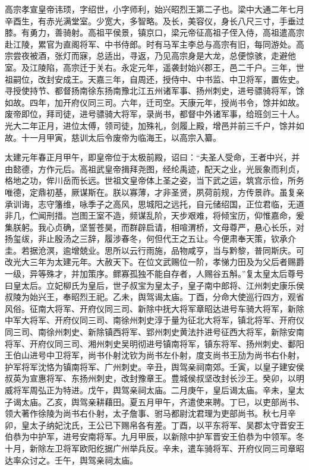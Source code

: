 \documentclass[]{article}
\begin{document}
高宗孝宣皇帝讳顼，字绍世，小字师利，始兴昭烈王第二子也。梁中大通二年七月辛酉生，有赤光满堂室。少宽大，多智略。及长，美容仪，身长八尺三寸，手垂过膝。有勇力，善骑射。高祖平侯景，镇京口，梁元帝征高祖子侄入侍，高祖遣高宗赴江陵，累官为直阁将军、中书侍郎。时有马军主李总与高宗有旧，每同游处。高宗尝夜被酒，张灯而寐，总适出，寻返，乃见高宗身是大龙，总便惊骇，走避他室。及江陵陷，高宗迁于关右。永定元年，遥袭封始兴郡王，邑二千户。三年，世祖嗣位，改封安成王。天嘉三年，自周还，授侍中、中书监、中卫将军，置佐史。寻授使持节、都督扬南徐东扬南豫北江五州诸军事、扬州刺史，进号骠骑将军，馀如故。四年，加开府仪同三司。六年，迁司空。天康元年，授尚书令，馀并如故。废帝即位，拜司徒，进号骠骑大将军，录尚书，都督中外诸军事，给班剑三十人。光大二年正月，进位太傅，领司徒，加殊礼，剑履上殿，增邑并前三千户，馀并如故。十一月甲寅，慈训太后令废帝为临海王，以高宗入纂。

太建元年春正月甲午，即皇帝位于太极前殿，诏曰：``夫圣人受命，王者中兴，并由懿德，方作元后。高祖武皇帝揖拜尧图，经纶禹迹，配天之业，光辰象而利贞，格地之功，侔川岳而长远。世祖文皇帝体上圣之姿，当下武之运，筑宫示俭，所务唯德，定鼎初基，厥谋斯在。朕以寡薄，才非圣贤，夙荷前规，方传景祚。虽复亲承训诲，志守籓维，咏季子之高风，思城阳之远托，自元储绍国，正位君临，无道非几，伫闻刑措。岂图王室不造，频谋乱阶，天步艰难，将倾宝历，仰惟嘉命，爰集朕躬。我心贞确，坚誓苍昊，而群辟启请，相喧渭桥，文母尊严，悬心长乐，对扬玺绂，非止殷汤之三辞，履涉春冬，何但代王之五让。今便肃奉天策，钦承介圭。若据沧溟，逾增兢业。思所以云行雨施，品物咸亨，当与黔黎，普同斯庆。可改光大三年为太建元年。大赦天下。在位文武赐位一阶，孝悌力田及为父后者赐爵一级，异等殊才，并加策序。鳏寡孤独不能自存者，人赐谷五斛。''复太皇太后尊号曰皇太后。立妃柳氏为皇后，世子叔宝为皇太子，皇子南中郎将、江州刺史康乐侯叔陵为始兴王，奉昭烈王祀。乙未，舆驾谒太庙。丁酉，分命大使巡行四方，观省风俗。征南大将军、开府仪同三司、新除中抚大将军章昭达进号车骑大将军，新除中军大将军、开府仪同三司、南徐州刺史淳于量为征北大将军，镇北将军、开府仪同三司、南徐州刺史、新除镇西将军、郢州刺史黄法抃进号征西大将军，新除安南将军、开府仪同三司、湘州刺史吴明彻进号镇南将军，镇东将军、扬州刺史、鄱阳王伯山进号中卫将军，尚书仆射沈钦为尚书左仆射，度支尚书王劢为尚书右仆射，护军将军沈恪为镇南将军、广州刺史。辛丑，舆驾亲祠南郊。壬寅，以皇子建安侯叔英为宣惠将军、东扬州刺史，改封豫章王。豊城侯叔坚改封长沙王。癸卯，以明威将军周弘正为特进。戊午，舆驾亲祠太庙。二月庚午，皇后谒太庙。辛未，皇太子谒太庙。乙亥，舆驾亲耕藉田。夏五月甲午，齐遣使来聘。丁巳，以吏部尚书、领大著作徐陵为尚书右仆射，太子詹事、驸马都尉沈君理为吏部尚书。秋七月辛卯，皇太子纳妃沈氏，王公已下赐帛各有差。丁酉，以平东将军、吴郡太守晋安王伯恭为中护军，进号安南将军。九月甲辰，以新除中护军晋安王伯恭为中领军。冬十月，新除左卫将军欧阳纥据广州举兵反。辛未，遣车骑将军、开府仪同三司章昭达率众讨之。壬午，舆驾亲祠太庙。
\end{document}
